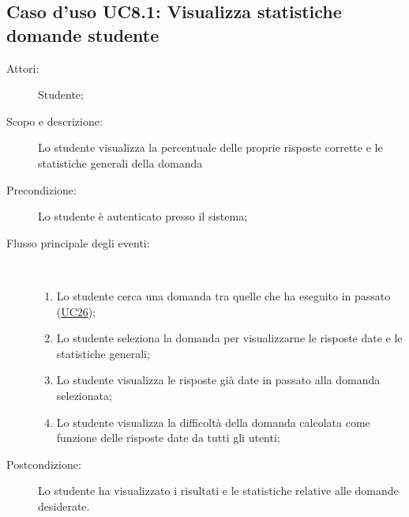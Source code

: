 \subsection{Caso d'uso UC8.1: Visualizza statistiche domande studente}\begin{description}
	\item[Attori:] Studente;
	\item[Scopo e descrizione:] Lo studente visualizza la percentuale delle proprie risposte corrette e le statistiche generali della domanda
	\item[Precondizione:] Lo studente è autenticato presso il sistema;
	
	\item[Flusso principale degli eventi:] \ 
	\begin{enumerate}
		\item Lo studente cerca una domanda tra quelle che ha eseguito in passato (\hyperlink{UC26}{UC26});
		\item Lo studente seleziona la domanda per visualizzarne le risposte date e le statistiche generali;
		\item Lo studente visualizza le risposte già date in passato alla domanda selezionata;
		\item Lo studente visualizza la difficoltà della domanda calcolata come funzione delle risposte date da tutti gli utenti;
		
	\end{enumerate}
	\item[Postcondizione:] Lo studente ha visualizzato i risultati e le statistiche relative alle domande desiderate.
\end{description}
\hypertarget{UC8.2}{}
